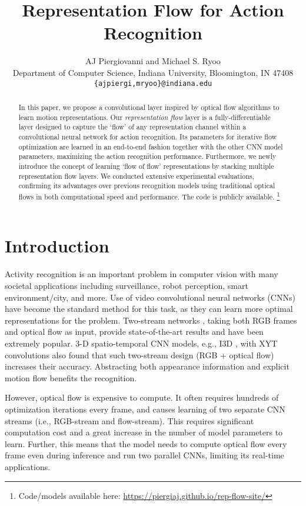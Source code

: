 \documentclass[10pt,twocolumn,letterpaper]{article}
\title{Representation Flow for Action Recognition}
\author{AJ Piergiovanni and Michael S. Ryoo\\
Department of Computer Science, Indiana University, Bloomington, IN 47408 \\
\texttt{\{ajpiergi,mryoo\}@indiana.edu}\\
}
\begin{document}
\maketitle

\begin{abstract}

In this paper, we propose a convolutional layer inspired by optical flow algorithms to learn motion representations. Our \emph{representation flow} layer is a fully-differentiable layer designed to capture the `flow' of any representation channel within a convolutional neural network for action recognition. Its parameters for iterative flow optimization are learned in an end-to-end fashion together with the other CNN model parameters, maximizing the action recognition performance. Furthermore, we newly introduce the concept of learning `flow of flow' representations by stacking multiple representation flow layers.
We conducted extensive experimental evaluations, confirming its advantages over previous recognition models using traditional optical flows in both computational speed and performance. The code is publicly available. \footnote{Code/models available here: \href{https://piergiaj.github.io/rep-flow-site/}{https://piergiaj.github.io/rep-flow-site/}}
\end{abstract}


\section{Introduction}

Activity recognition is an important problem in computer vision with many societal applications including surveillance, robot perception, smart environment/city, and more. Use of video convolutional neural networks (CNNs) have become the standard method for this task, as they can learn more optimal representations for the problem. Two-stream networks \cite{simonyan2014two}, taking both RGB frames and optical flow as input, provide state-of-the-art results and have been extremely popular. 3-D spatio-temporal CNN models, e.g., I3D \cite{carreira2017quo}, with XYT convolutions also found that such two-stream design (RGB + optical flow) increases their accuracy. Abstracting both appearance information and explicit motion flow benefits the recognition.



However, optical flow is expensive to compute. It often requires hundreds of optimization iterations every frame, and causes learning of two separate CNN streams (i.e., RGB-stream and flow-stream). This requires significant computation cost and a great increase in the number of model parameters to learn. Further, this means that the model needs to compute optical flow every frame even during inference and run two parallel CNNs, limiting its real-time applications.
\end{document}
